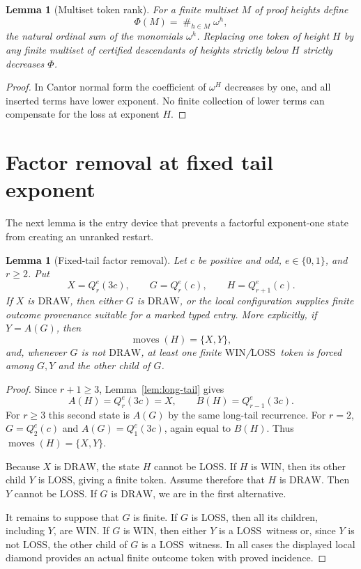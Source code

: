 \documentclass[11pt]{article}
\newtheorem{lemma}[theorem]{Lemma}
\newcommand{\WIN}{\ensuremath{\mathrm{WIN}}}
\newcommand{\LOSS}{\ensuremath{\mathrm{LOSS}}}
\newcommand{\DRAW}{\ensuremath{\mathrm{DRAW}}}
\newcommand{\Moves}{\operatorname{moves}}
\begin{document}
\begin{lemma}[Multiset token rank]\label{lem:token-rank}
For a finite multiset $M$ of proof heights define
\[
  \Phi(M)=\mathop{\#}_{h\in M}\omega^h,
\]
the natural ordinal sum of the monomials $\omega^h$. Replacing one token of
height $H$ by any finite multiset of certified descendants of heights strictly
below $H$ strictly decreases $\Phi$.
\end{lemma}

\begin{proof}
In Cantor normal form the coefficient of $\omega^H$ decreases by one, and all
inserted terms have lower exponent. No finite collection of lower terms can
compensate for the loss at exponent $H$.
\end{proof}

\section{Factor removal at fixed tail exponent}

The next lemma is the entry device that prevents a factorful exponent-one
state from creating an unranked restart.

\begin{lemma}[Fixed-tail factor removal]\label{lem:fixed-tail-factor}
Let $c$ be positive and odd, $e\in\{0,1\}$, and $r\ge2$. Put
\[
  X=Q_r^e(3c),\qquad G=Q_r^e(c),\qquad H=Q_{r+1}^e(c).
\]
If $X$ is \DRAW, then either $G$ is \DRAW, or the local configuration supplies
finite outcome provenance suitable for a marked typed entry. More explicitly,
if $Y=A(G)$, then
\[
  \Moves(H)=\{X,Y\},
\]
and, whenever $G$ is not \DRAW, at least one finite \WIN/\LOSS\ token is forced
among $G,Y$ and the other child of $G$.
\end{lemma}

\begin{proof}
Since $r+1\ge3$, Lemma~\ref{lem:long-tail} gives
\[
  A(H)=Q_r^e(3c)=X,
  \qquad
  B(H)=Q_{r-1}^e(3c).
\]
For $r\ge3$ this second state is $A(G)$ by the same long-tail recurrence. For
$r=2$, $G=Q_2^e(c)$ and $A(G)=Q_1^e(3c)$, again equal to $B(H)$. Thus
$\Moves(H)=\{X,Y\}$.

Because $X$ is \DRAW, the state $H$ cannot be \LOSS. If $H$ is \WIN, then its
other child $Y$ is \LOSS, giving a finite token. Assume therefore that $H$ is
\DRAW. Then $Y$ cannot be \LOSS. If $G$ is \DRAW, we are in the first
alternative.

It remains to suppose that $G$ is finite. If $G$ is \LOSS, then all its
children, including $Y$, are \WIN. If $G$ is \WIN, then either $Y$ is a \LOSS\
witness or, since $Y$ is not \LOSS, the other child of $G$ is a \LOSS\ witness.
In all cases the displayed local diamond provides an actual finite outcome
token with proved incidence.
\end{proof}
\end{document}
